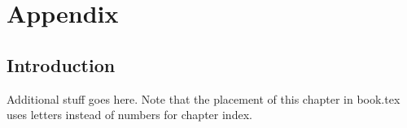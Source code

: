 \chapter{Appendix}\label{chap:Appendix}

\section{Introduction}\label{sec:appendix-introduction}
Additional stuff goes here. Note that the placement of this chapter in book.tex uses letters instead of numbers for chapter index.
